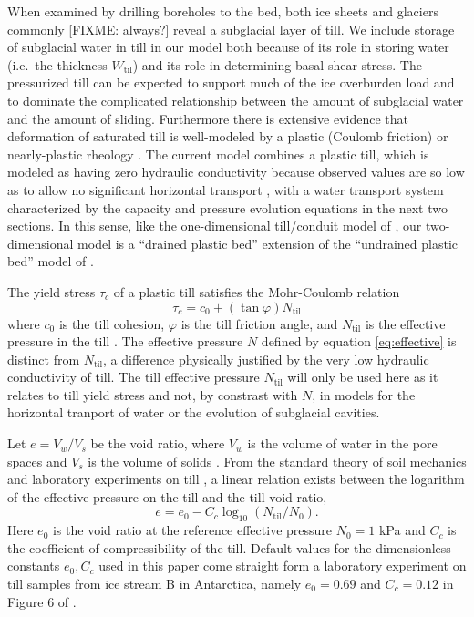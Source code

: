 \documentclass[11pt,final]{amsart}
\newcommand{\Wtil}{W_{\text{til}}}
\begin{document}
When examined by drilling boreholes to the bed, both ice sheets \citep{Tulaczyketal2000} and glaciers \citep{Hookeetal1997,TrufferHarrisonEchelmeyer2000} commonly [FIXME: always?] reveal a subglacial layer of till.  We include storage of subglacial water in till in our model both because of its role in storing water (i.e.~the thickness $\Wtil$) and its role in determining basal shear stress.  The pressurized till can be expected to support much of the ice overburden load and to dominate the complicated relationship between the amount of subglacial water and the amount of sliding.  Furthermore there is extensive evidence that deformation of saturated till is well-modeled by a plastic (Coulomb friction) or nearly-plastic rheology \citep{Hookeetal1997,SchoofTill,TrufferHarrisonEchelmeyer2000,Tulaczyketal2000}.  The current model combines a plastic till, which is modeled as having zero hydraulic conductivity because observed values are so low as to allow no significant horizontal transport \citep{LingleBrown1987,Tulaczyketal2000}, with a water transport system characterized by the capacity and pressure evolution equations in the next two sections.  In this sense, like the one-dimensional till/conduit model of \cite{vanderWeletal2013}, our two-dimensional model is a ``drained plastic bed'' extension of the ``undrained plastic bed'' model of \cite{Tulaczyketal2000b}.

The yield stress $\tau_c$ of a plastic till satisfies the Mohr-Coulomb relation
\newcommand{\Ntil}{N_{\text{til}}}
\begin{equation}
\tau_c = c_0 + (\tan \varphi) \Ntil  \label{eq:mohrcoulomb}
\end{equation}
where $c_0$ is the till cohesion, $\varphi$ is the till friction angle, and $\Ntil$ is the effective pressure in the till \citep{BBssasliding,Paterson}.  The effective pressure $N$ defined by equation \eqref{eq:effective} is distinct from $\Ntil$, a difference physically justified by the very low hydraulic conductivity of till.  The till effective pressure $\Ntil$ will only be used here as it relates to till yield stress and not, by constrast with $N$, in models for the horizontal tranport of water or the evolution of subglacial cavities.

Let $e = V_w / V_s$ be the void ratio, where $V_w$ is the volume of water in the pore spaces and $V_s$ is the volume of solids \citep{Tulaczyketal2000}.  From the standard theory of soil mechanics and laboratory experiments on till \citep{Hookeetal1997,Tulaczyketal2000}, a linear relation exists between the logarithm of the effective pressure on the till and the till void ratio,
\begin{equation}
e = e_0 - C_c \log_{10}\left(\Ntil / N_0\right).  \label{eq:voidpressure}
\end{equation}
Here $e_0$ is the void ratio at the reference effective pressure $N_0 = 1$ kPa and $C_c$ is the coefficient of compressibility of the till.  Default values for the dimensionless constants $e_0,C_c$ used in this paper come straight form a laboratory experiment on till samples from ice stream B in Antarctica, namely $e_0=0.69$ and $C_c=0.12$ in Figure 6 of \cite{Tulaczyketal2000}.
\end{document}

